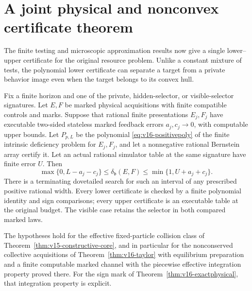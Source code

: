 \section{A joint physical and nonconvex certificate theorem}
\label{sec:v16-joint}
The finite testing and microscopic approximation results now give a
single lower--upper certificate for the original resource problem.
Unlike a constant mixture of tests, the polynomial lower certificate
can separate a target from a private behavior image even when the
target belongs to its convex hull.

\begin{theorem}
\label{thm:v16-main}
Fix a finite horizon and one of the private, hidden-selector, or
visible-selector signatures. Let $E,F$ be marked physical acquisitions
with finite compatible controls and marks. Suppose that rational finite
presentations $E_j,F_j$ have executable two-sided stateless marked
feedback errors $a_j,c_j\to0$, with computable upper bounds. Let
$P_{p,L}$ be the polynomial \eqref{eq:v16-positivepoly} of the finite
intrinsic deficiency problem for $E_j,F_j$, and let a nonnegative
rational Bernstein array certify it. Let an actual rational simulator
table at the same signature have finite error $U$. Then
\begin{equation}\label{eq:v16-main}
 \max\{0,L-a_j-c_j\}\le\delta_{\mathfrak b}(E,F)
                \le\min\{1,U+a_j+c_j\}.
\end{equation}
There is a terminating dovetailed search for such an interval of any
prescribed positive rational width. Every lower certificate is checked
by a finite polynomial identity and sign comparisons; every upper
certificate is an executable table at the original budget. The visible
case retains the selector in both compared marked laws.

The hypotheses hold for the effective fixed-particle collision class
of Theorem~\ref{thm:v15-constructive-core}, and in particular for the
nonconserved collective acquisitions of Theorem~\ref{thm:v16-taylor}
with equilibrium preparation and a finite computable marked channel
with the piecewise effective integration property proved there.
For the sign mark of Theorem~\ref{thm:v16-exactphysical}, that integration
property is explicit.
\end{theorem}
